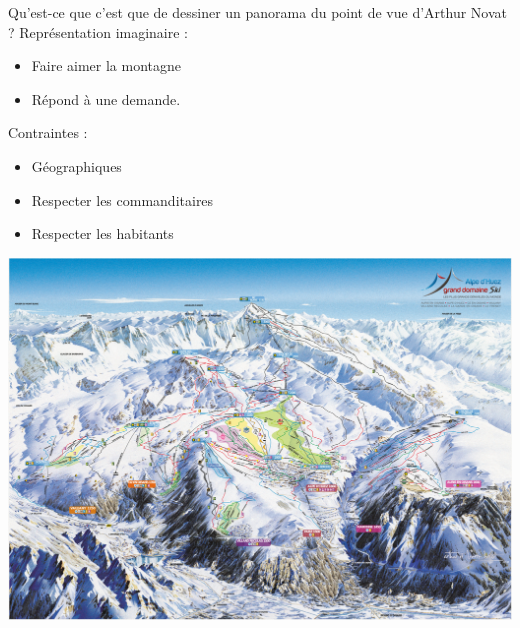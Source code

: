 \documentclass{beamer}
\begin{document}
\begin{frame}[noframenumbering]{Qu'est-ce que c'est que de dessiner un panorama du point de vue d'Arthur Novat ?}
Représentation imaginaire :
\begin{itemize}
\item Faire aimer la montagne
\item Répond à une demande. 
\end{itemize}
\begin{center}
\begin{minipage}[c]{0.45\linewidth}
Contraintes :
\begin{itemize}
\item Géographiques 
\item Respecter les commanditaires
\item Respecter les habitants
\end{itemize}	
\end{minipage}
\begin{minipage}[c]{0.45\linewidth}
\begin{center}
\includegraphics[width=1.0\textwidth]{Images/AlpeHuez_pistes.png}
\end{center}
\end{minipage}
\end{center}

\end{frame}
\end{document}
